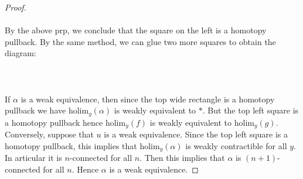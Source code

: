 \documentclass[a4paper]{article}
\begin{document}
\begin{prp}{}{}
\begin{proof}
\\~\\
By the above prp, we conclude that the square on the left is a homotopy pullback. By the same method, we can glue two more squares to obtain the diagram: \\~\\
\\~\\
If $\alpha$ is a weak equivalence, then since the top wide rectangle is a homotopy pullback we have $\text{holim}_y(\alpha)$ is weakly equivalent to $\ast$. But the top left square is a homotopy pullback hence $\text{holim}_y(f)$ is weakly equivalent to $\text{holim}_y(g)$. Conversely, suppose that $u$ is a weak equivalence. Since the top left square is a homotopy pullback, this implies that $\text{holim}_y(\alpha)$ is weakly contractible for all $y$. In articular it is $n$-connected for all $n$. Then this implies that $\alpha$ is $(n+1)$-connected for all $n$. Hence $\alpha$ is a weak equivalence. 
\end{proof}
\end{prp}
\end{document}
